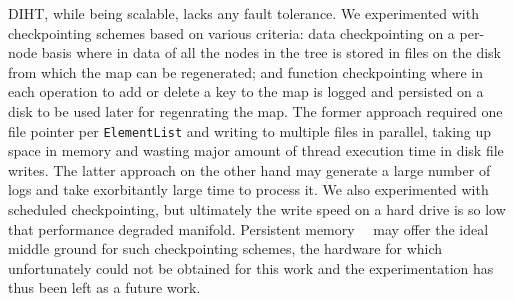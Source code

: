 \documentclass[letterpaper, 10 pt, conference]{ieeeconf}  %
\begin{document}
DIHT, while being scalable, lacks any fault tolerance. We experimented with checkpointing schemes based on various criteria: data checkpointing on a per-node basis where in data of all the nodes in the tree is stored in files on the disk from which the map can be regenerated; and function checkpointing where in each operation to add or delete a key to the map is logged and persisted on a disk to be used later for regenrating the map. The former approach required one file pointer per \texttt{ElementList} and writing to multiple files in parallel, taking up space in memory and wasting major amount of thread execution time in disk file writes. The latter approach on the other hand may generate a large number of logs and take exorbitantly large time to process it. We also experimented with scheduled checkpointing, but ultimately the write speed on a hard drive is so low that performance degraded manifold. Persistent memory~\cite{persistent}~\cite{makalu} may offer the ideal middle ground for such checkpointing schemes, the hardware for which unfortunately could not be obtained for this work and the experimentation has thus been left as a future work.



\end{document}
